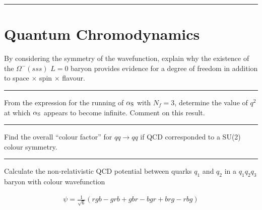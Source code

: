 
\noindent\rule{7in}{2.8pt}
\section{Quantum Chromodynamics}
    
\begin{problem}{10.1}
By considering the symmetry of the wavefunction, explain why the existence of the $\Omega^-(sss)$ $L = 0$ baryon provides evidence for a degree of freedom in addition to space $\times$ spin $\times$ flavour.
\end{problem}
\begin{solution}

\end{solution}

\noindent\rule{7in}{1.5pt}


\begin{problem}{10.2}
From the expression for the running of $\alpha_\text{S}$ with $N_f = 3$, determine the value of $q^2$ at which $\alpha_\text{S}$ appears to become infinite. Comment on this result.
\end{problem}
\begin{solution}

\end{solution}

\noindent\rule{7in}{1.5pt}


\begin{problem}{10.3}
Find the overall “colour factor” for $qq \to qq$ if QCD corresponded to a SU(2) colour symmetry.
\end{problem}
\begin{solution}

\end{solution}

\noindent\rule{7in}{1.5pt}


\begin{problem}{10.4}
Calculate the non-relativistic QCD potential between quarks $q_1$ and $q_2$ in a $q_1q_2q_3$ baryon with colour wavefunction

\begin{align*}
    \psi = \frac{1}{\sqrt{6}} \left(  rgb-grb+gbr-bgr  +brg - rbg\right)
\end{align*}\\
\end{problem}
\begin{solution}

\end{solution}

